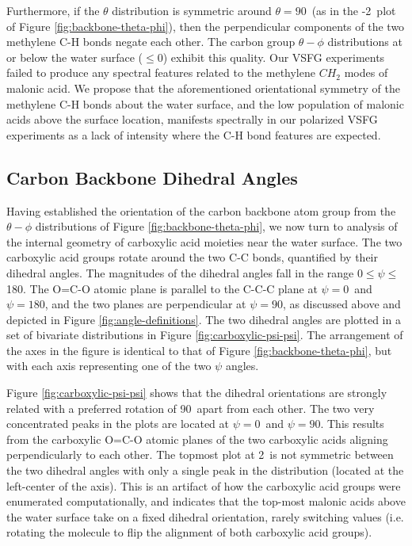 Furthermore, if the $\theta$ distribution is symmetric around $\theta=90$\textdegree~(as in the -2\angs~plot of Figure \ref{fig:backbone-theta-phi}), then the perpendicular components of the two methylene C-H bonds negate each other. The carbon group $\theta-\phi$ distributions at or below the water surface ($\le 0$\angs) exhibit this quality. Our VSFG experiments failed to produce any spectral features related to the methylene $CH_2$ modes of malonic acid. We propose that the aforementioned orientational symmetry of the methylene C-H bonds about the water surface, and the low population of malonic acids above the surface location, manifests spectrally in our polarized VSFG experiments as a lack of intensity where the C-H bond features are expected. 

\subsection {Carbon Backbone Dihedral Angles}

Having established the orientation of the carbon backbone atom group from the $\theta-\phi$ distributions of Figure \ref{fig:backbone-theta-phi}, we now turn to analysis of the  internal geometry of carboxylic acid moieties near the water surface. The two carboxylic acid groups rotate around the two C-C bonds, quantified by their dihedral angles. The magnitudes of the dihedral angles fall in the range 0\textdegree$\le \psi \le$180\textdegree. The O=C-O atomic plane is parallel to the C-C-C plane at $\psi=0$\textdegree~and $\psi=180$\textdegree, and the two planes are perpendicular at $\psi=90$\textdegree, as discussed above and depicted in Figure \ref{fig:angle-definitions}. The two dihedral angles are plotted in a set of bivariate distributions in Figure \ref{fig:carboxylic-psi-psi}. The arrangement of the axes in the figure is identical to that of Figure \ref{fig:backbone-theta-phi}, but with each axis representing one of the two $\psi$ angles.

Figure \ref{fig:carboxylic-psi-psi} shows that the dihedral orientations are strongly related with a preferred rotation of 90\textdegree~apart from each other. The two very concentrated peaks in the plots are located at $\psi=0$\textdegree~and $\psi=90$\textdegree. This results from the carboxylic O=C-O atomic planes of the two carboxylic acids aligning perpendicularly to each other. The topmost plot at 2\angs~is not symmetric between the two dihedral angles with only a single peak in the distribution (located at the left-center of the axis). This is an artifact of how the carboxylic acid groups were enumerated computationally, and indicates that the top-most malonic acids above the water surface take on a fixed dihedral orientation, rarely switching values (i.e. rotating the molecule to flip the alignment of both carboxylic acid groups).


